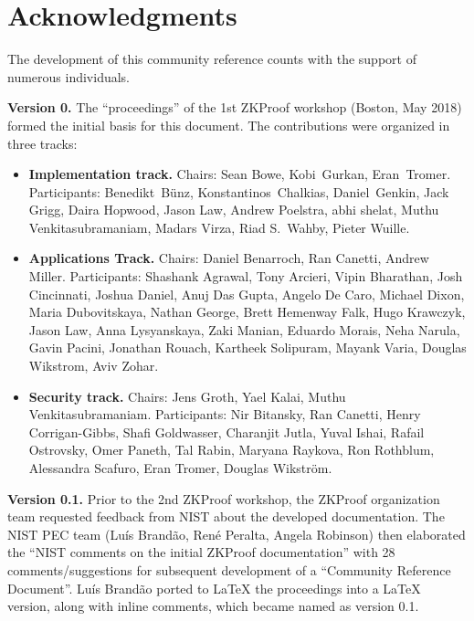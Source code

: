 \chapter*{Acknowledgments}
\label{app:acknowledgments}


The development of this community reference counts with the support of numerous individuals.


\textbf{Version 0.}
The ``proceedings'' of the 1st ZKProof workshop (Boston, May 2018) formed the initial basis for this document.
The contributions were organized in three tracks:

\begin{itemize}\setlength{\itemsep}{1ex}
	
\item \textbf{Implementation track.} 
	Chairs: Sean Bowe, Kobi Gurkan, Eran Tromer.
	Participants: Benedikt Bünz, Konstantinos Chalkias, Daniel Genkin, Jack Grigg, Daira Hopwood, Jason Law, Andrew Poelstra, abhi shelat, Muthu Venkita\-subramaniam, Madars Virza, Riad S.\ Wahby, Pieter Wuille.
	
\item \textbf{Applications Track.}
	Chairs: Daniel Benarroch, Ran Canetti, Andrew Miller.
	Participants: Shashank Agrawal, Tony Arcieri, Vipin Bharathan, Josh Cincinnati, Joshua Daniel,  Anuj Das Gupta, Angelo De Caro, Michael Dixon, Maria Dubovitskaya, Nathan George, Brett Hemenway Falk, Hugo Krawczyk, Jason Law, Anna Lysyanskaya, Zaki Manian, Eduardo Morais, Neha Narula, Gavin Pacini, Jonathan Rouach, Kartheek Solipuram, Mayank Varia, Douglas Wikstrom, Aviv Zohar.

\item \textbf{Security track.}
	Chairs: Jens Groth, Yael Kalai, Muthu Venkitasubramaniam.
	Participants: Nir Bitansky, Ran Canetti, Henry Corrigan-Gibbs, Shafi Goldwasser, Charanjit Jutla, Yuval Ishai, Rafail Ostrovsky, Omer Paneth, Tal Rabin, Maryana Raykova, Ron Rothblum, Alessandra Scafuro, Eran Tromer, Douglas Wikström.

\end{itemize}


\textbf{Version 0.1.}
	Prior to the 2nd ZKProof workshop, the ZKProof organization team requested feedback from NIST about the developed documentation.
	The NIST PEC team (Luís Brandão, René Peralta, Angela Robinson) then elaborated the 
``NIST comments on the initial ZKProof documentation'' with 28 comments/suggestions 
for subsequent development of a ``Community Reference Document''.
	Luís Brandão ported to LaTeX the proceedings into a LaTeX version, along with inline comments, which became named as version 0.1.


